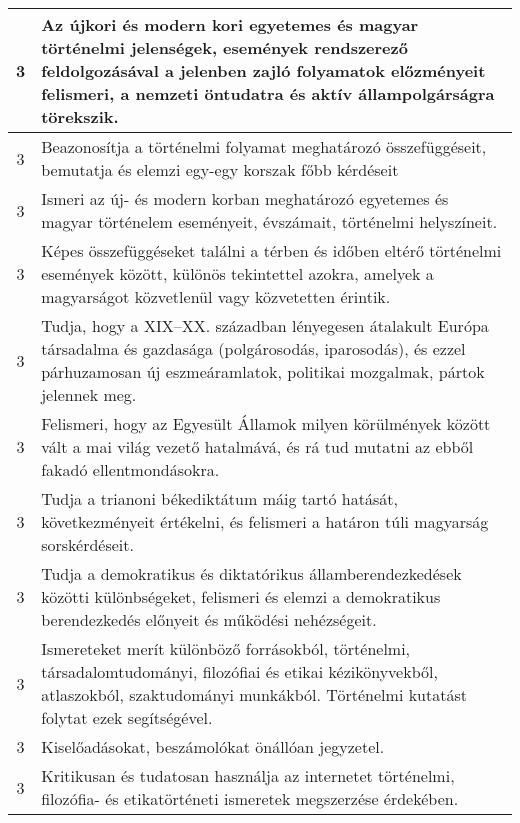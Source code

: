 \begin{longtable}{c | p{12cm} }
                                
                                          3 &  Az újkori és modern kori egyetemes és magyar történelmi jelenségek, események rendszerező feldolgozásával a jelenben zajló folyamatok előzményeit felismeri, a nemzeti öntudatra és aktív állampolgárságra törekszik. \\ \hline
                                          3 &  Beazonosítja a történelmi folyamat meghatározó összefüggéseit, bemutatja és elemzi egy-egy korszak főbb kérdéseit \\ \hline
                                          3 &  Ismeri az új- és modern korban meghatározó egyetemes és magyar történelem eseményeit, évszámait, történelmi helyszíneit. \\ \hline
                                          3 &  Képes összefüggéseket találni a térben és időben eltérő történelmi események között, különös tekintettel azokra, amelyek a magyarságot közvetlenül vagy közvetetten érintik. \\ \hline
                                          3 &  Tudja, hogy a XIX–XX. században lényegesen átalakult Európa társadalma és gazdasága (polgárosodás, iparosodás), és ezzel párhuzamosan új eszmeáramlatok, politikai mozgalmak, pártok jelennek meg. \\ \hline
                                          3 &  Felismeri, hogy az Egyesült Államok milyen körülmények között vált a mai világ vezető hatalmává, és rá tud mutatni az ebből fakadó ellentmondásokra. \\ \hline
                                          3 &  Tudja a trianoni békediktátum máig tartó hatását, következményeit értékelni, és felismeri a határon túli magyarság sorskérdéseit. \\ \hline
                                          3 &  Tudja a demokratikus és diktatórikus államberendezkedések közötti különbségeket, felismeri és elemzi a demokratikus berendezkedés előnyeit és működési nehézségeit. \\ \hline
                                          3 &  Ismereteket merít különböző forrásokból, történelmi, társadalomtudományi, filozófiai és etikai kézikönyvekből, atlaszokból, szaktudományi munkákból. Történelmi kutatást folytat ezek segítségével. \\ \hline
                                          3 &  Kiselőadásokat, beszámolókat önállóan jegyzetel. \\ \hline
                                          3 &  Kritikusan és tudatosan használja az internetet történelmi, filozófia- és etikatörténeti ismeretek megszerzése érdekében. \\ \hline

\end{longtable}
